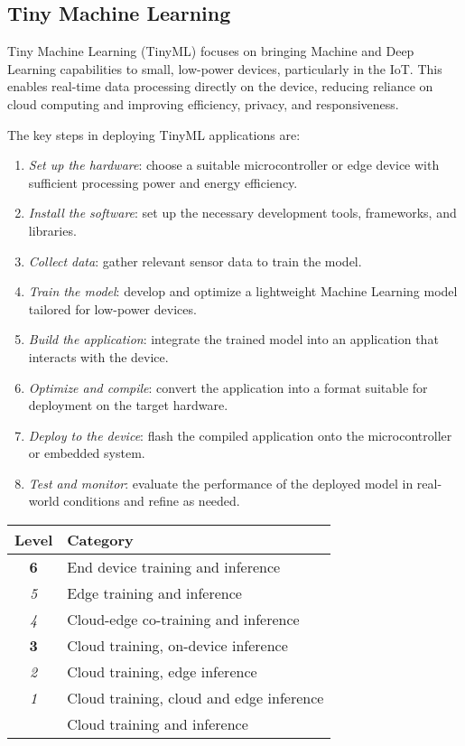 \subsection{Tiny Machine Learning}
Tiny Machine Learning (TinyML) focuses on bringing Machine and Deep Learning capabilities to small, low-power devices, particularly in the IoT. 
This enables real-time data processing directly on the device, reducing reliance on cloud computing and improving efficiency, privacy, and responsiveness.  

The key steps in deploying TinyML applications are:  
\begin{enumerate}
    \item \textit{Set up the hardware}: choose a suitable microcontroller or edge device with sufficient processing power and energy efficiency.
    \item \textit{Install the software}: set up the necessary development tools, frameworks, and libraries.
    \item \textit{Collect data}: gather relevant sensor data to train the model.
    \item \textit{Train the model}: develop and optimize a lightweight Machine Learning model tailored for low-power devices.
    \item \textit{Build the application}: integrate the trained model into an application that interacts with the device.
    \item \textit{Optimize and compile}: convert the application into a format suitable for deployment on the target hardware.
    \item \textit{Deploy to the device}: flash the compiled application onto the microcontroller or embedded system.
    \item \textit{Test and monitor}: evaluate the performance of the deployed model in real-world conditions and refine as needed.
\end{enumerate}

\begin{table}[h]
    \centering
    \begin{tabular}{|c|l|}
        \hline
        \textbf{Level} & \textbf{Category} \\ \hline
        \textbf{6} & End device training and inference \\ \hline
        \textit{5} & Edge training and inference \\ \hline
        \textit{4} & Cloud-edge co-training and inference \\ \hline
        \textbf{3} & Cloud training, on-device inference \\  \hline
        \textit{2} & Cloud training, edge inference \\ \hline
        \textit{1} & Cloud training, cloud and edge inference \\  \hline
                   & Cloud training and inference \\ \hline
    \end{tabular}
\end{table}
